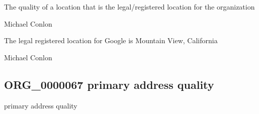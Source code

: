 \documentclass[letterpaper,10pt,english]{sphinxmanual}
\begin{document}
\begin{sphinxShadowBox}

\sphinxAtStartPar
The quality of a location that is the legal/registered location for the organization
\end{sphinxShadowBox}

\begin{sphinxShadowBox}

\sphinxAtStartPar
Michael Conlon 
\end{sphinxShadowBox}

\begin{sphinxShadowBox}

\sphinxAtStartPar
The legal registered location for Google is Mountain View, California
\end{sphinxShadowBox}

\begin{sphinxShadowBox}

\sphinxAtStartPar
Michael Conlon 
\end{sphinxShadowBox}
\begin{quote}

\ignorespaces \end{quote}


\subsection{ORG\_0000067 \sphinxhyphen{} primary address quality}
\label{\detokenize{doc-ORG_0000067:org-0000067-primary-address-quality}}\label{\detokenize{doc-ORG_0000067:index-0}}\label{\detokenize{doc-ORG_0000067::doc}}
\begin{sphinxShadowBox}

\sphinxAtStartPar
primary address quality
\end{sphinxShadowBox}

\begin{sphinxShadowBox}

\sphinxAtStartPar
{\hyperref[\detokenize{doc-BFO_0000019::doc}]{}}
\end{sphinxShadowBox}
\end{document}
